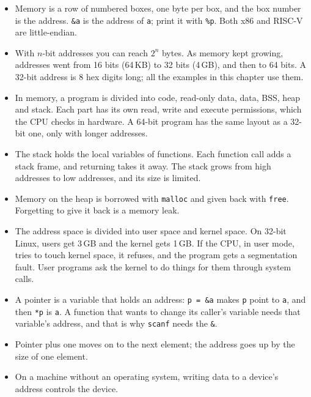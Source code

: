 \begin{itemize}
  \item Memory is a row of numbered boxes, one byte per box, and the box number is the address. \texttt{\&a} is the address of \texttt{a}; print it with \texttt{\%p}. Both x86 and RISC-V are little-endian.
  \item With $n$-bit addresses you can reach $2^n$ bytes. As memory kept growing, addresses went from 16 bits (64\,KB) to 32 bits (4\,GB), and then to 64 bits. A 32-bit address is 8 hex digits long; all the examples in this chapter use them.
  \item In memory, a program is divided into code, read-only data, data, BSS, heap and stack. Each part has its own read, write and execute permissions, which the CPU checks in hardware. A 64-bit program has the same layout as a 32-bit one, only with longer addresses.
  \item The stack holds the local variables of functions. Each function call adds a stack frame, and returning takes it away. The stack grows from high addresses to low addresses, and its size is limited.
  \item Memory on the heap is borrowed with \texttt{malloc} and given back with \texttt{free}. Forgetting to give it back is a memory leak.
  \item The address space is divided into user space and kernel space. On 32-bit Linux, users get 3\,GB and the kernel gets 1\,GB. If the CPU, in user mode, tries to touch kernel space, it refuses, and the program gets a segmentation fault. User programs ask the kernel to do things for them through system calls.
  \item A pointer is a variable that holds an address: \texttt{p = \&a} makes \texttt{p} point to \texttt{a}, and then \texttt{*p} is \texttt{a}. A function that wants to change its caller's variable needs that variable's address, and that is why \texttt{scanf} needs the \texttt{\&}.
  \item Pointer plus one moves on to the next element; the address goes up by the size of one element.
  \item On a machine without an operating system, writing data to a device's address controls the device.
\end{itemize}


